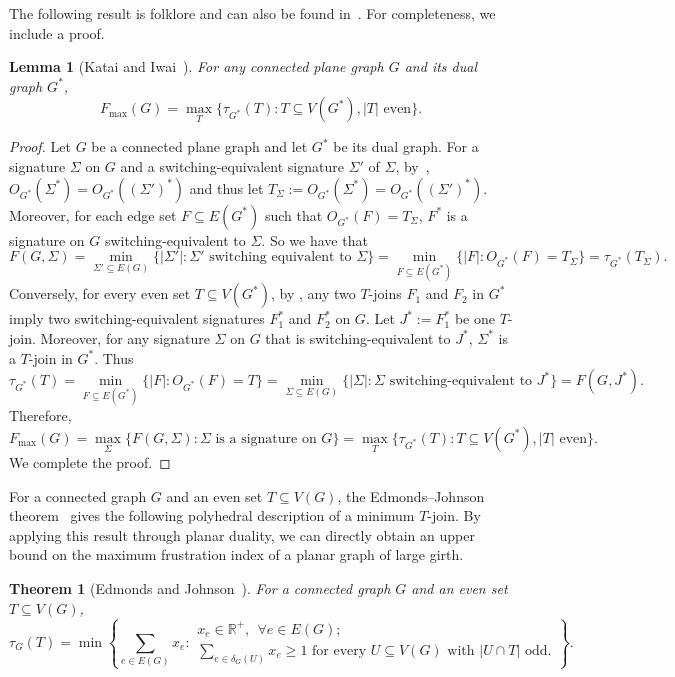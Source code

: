 \documentclass[a4paper,12pt]{article}
\theoremstyle{plain}
\newtheorem{theorem}{Theorem}[section]
\newtheorem{lemma}[lemma]{Lemma}
\theoremstyle{definition}
\theoremstyle{remark}
\numberwithin{equation}{section}
\newcommand{\abs}[1]{\lvert#1\rvert}
\begin{document}
The following result is folklore and can also be found in~\cite{KI1978}. For completeness, we include a proof.

\begin{lemma}[Katai and Iwai~\cite{KI1978}]\label{lem:tjoin-fmax}
For any connected plane graph $G$ and its dual graph $G^*$, $$F_{\max}(G)=\max\limits_T\{\tau_{G^*}(T): T\subseteq V(G^*), \abs{T}\text{~even} \}.$$
\end{lemma}
\begin{proof}
Let $G$ be a connected plane graph and let $G^*$ be its dual graph. For a signature $\Sigma$ on $G$ and a switching-equivalent signature $\Sigma'$ of $\Sigma$, by~, $O_{G^*}(\Sigma^*)=O_{G^*}((\Sigma')^*)$ and thus let $T_\Sigma:=O_{G^*}(\Sigma^*)=O_{G^*}((\Sigma')^*)$. Moreover, for each edge set $F\subseteq E(G^*)$ such that $O_{G^*}(F)=T_\Sigma$, $F^*$ is a signature on $G$ switching-equivalent to $\Sigma$.
So we have that
{\small 
$$
F(G,\Sigma)=\min\limits_{\Sigma'\subseteq E(G)}\{|\Sigma'|:\Sigma'\text{ switching equivalent to }\Sigma\}=\min\limits_{F\subseteq E(G^*)}\{|F|:O_{G^*}(F)=T_\Sigma\}=\tau_{G^*}(T_\Sigma).
$$} Conversely, for every even set $T\subseteq V(G^*)$, by , any two $T$-joins $F_1$ and $F_2$ in $G^*$ imply two switching-equivalent signatures $F_1^*$ and $F_2^*$ on $G$. Let $J^*:=F^*_1$ be one $T$-join. Moreover, for any signature $\Sigma$ on $G$ that is switching-equivalent to $J^*$, $\Sigma^*$ is a $T$-join in $G^*$. Thus 
{\small $$
\tau_{G^*}(T)=\min\limits_{F\subseteq E(G^*)}\{|F|:O_{G^*}(F)=T\}=\min\limits_{\Sigma\subseteq E(G)}\{|\Sigma|:\Sigma\text{~switching-equivalent to $J^*$}\}=F(G,J^*).
$$
}
Therefore, $$F_{\max}(G)=\max\limits_\Sigma \{F(G, \Sigma):  \Sigma \text{~is a signature on~}G\}=\max\limits_T\{\tau_{G^*}(T): T\subseteq V(G^*), \abs{T}\text{~even} \}.$$ We complete the proof.
\end{proof}

For a connected graph $G$ and an even set $T\subseteq V(G)$, the Edmonds--Johnson theorem~\cite{EJ1973} gives the following polyhedral description of a minimum $T$-join. By applying this result through planar duality, we can directly obtain an upper bound on the maximum frustration index of a planar graph of large girth.

\begin{theorem}[Edmonds and Johnson~\cite{EJ1973}]\label{thm:Edmonds--Johnson}
For a connected graph $G$ and an even set $T\subseteq V(G)$,
\begin{equation}\label{eq:tjoin-polytope}
    \tau_G(T)
    =\min\left\{
        \sum_{e\in E(G)}x_e:
        \begin{array}{l}
        x_e\in \mathbb{R}^+,~~\forall e\in E(G);\\[1mm]
        \sum\limits_{e\in \delta_G(U)} x_e\geq 1
        \text{~for every $U\subseteq V(G)$ with~}\abs{U\cap T}\text{ odd.}
        \end{array}
    \right\}.
\end{equation}  
\end{theorem}
\end{document}
